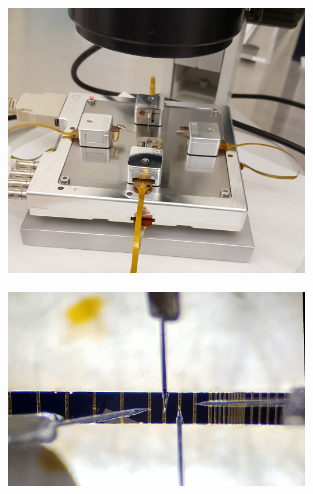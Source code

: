 \begin{figure}[t]
  \centering
    \includegraphics[width=0.7\textwidth]{fig/MiBots/setup.jpg}
 \caption{}
\label{mibot}
\end{figure}


\begin{figure}[t]
  \centering
    \includegraphics[width=0.7\textwidth]{fig/MiBots/closeup.jpg}
 \caption{}
\label{mibot}
\end{figure}

\cleardoublepage
